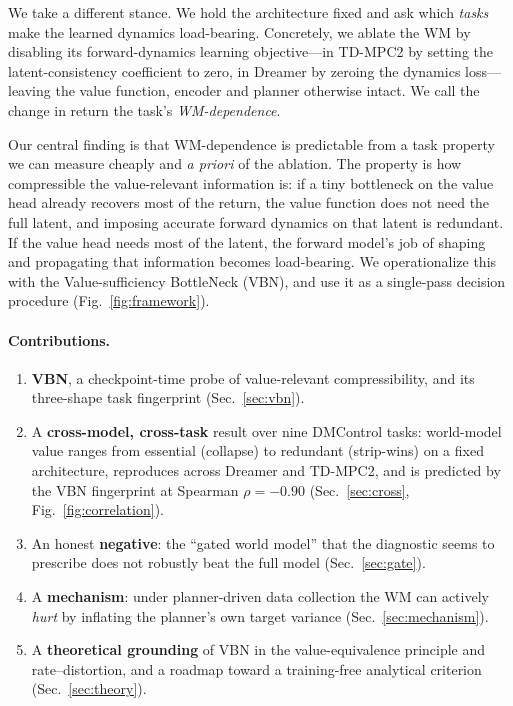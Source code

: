 \documentclass[letterpaper]{article}
\begin{document}
We take a different stance. We hold the architecture fixed and ask which
\emph{tasks} make the learned dynamics load-bearing. Concretely, we ablate
the WM by disabling its forward-dynamics learning objective---in TD-MPC2 by
setting the latent-consistency coefficient to zero, in Dreamer by zeroing the
dynamics loss---leaving the value function, encoder and planner otherwise
intact. We call the change in return the task's \emph{WM-dependence}.

Our central finding is that WM-dependence is predictable from a task property
we can measure cheaply and \emph{a priori} of the ablation. The property is
how compressible the value-relevant information is: if a tiny bottleneck on
the value head already recovers most of the return, the value function does
not need the full latent, and imposing accurate forward dynamics on that
latent is redundant. If the value head needs most of the latent, the forward
model's job of shaping and propagating that information becomes load-bearing.
We operationalize this with the Value-sufficiency BottleNeck (VBN), and use it
as a single-pass decision procedure (Fig.~\ref{fig:framework}).

\paragraph{Contributions.}
\begin{enumerate}\itemsep2pt
\item \textbf{VBN}, a checkpoint-time probe of value-relevant
compressibility, and its three-shape task fingerprint (Sec.~\ref{sec:vbn}).
\item A \textbf{cross-model, cross-task} result over nine DMControl tasks:
world-model value ranges from essential (collapse) to redundant (strip-wins)
on a fixed architecture, reproduces across Dreamer and TD-MPC2, and is
predicted by the VBN fingerprint at Spearman $\rho{=}{-}0.90$
(Sec.~\ref{sec:cross}, Fig.~\ref{fig:correlation}).
\item An honest \textbf{negative}: the ``gated world model'' that the
diagnostic seems to prescribe does not robustly beat the full model
(Sec.~\ref{sec:gate}).
\item A \textbf{mechanism}: under planner-driven data collection the WM can
actively \emph{hurt} by inflating the planner's own target variance
(Sec.~\ref{sec:mechanism}).
\item A \textbf{theoretical grounding} of VBN in the value-equivalence
principle and rate--distortion, and a roadmap toward a training-free
analytical criterion (Sec.~\ref{sec:theory}).
\end{enumerate}
\end{document}
